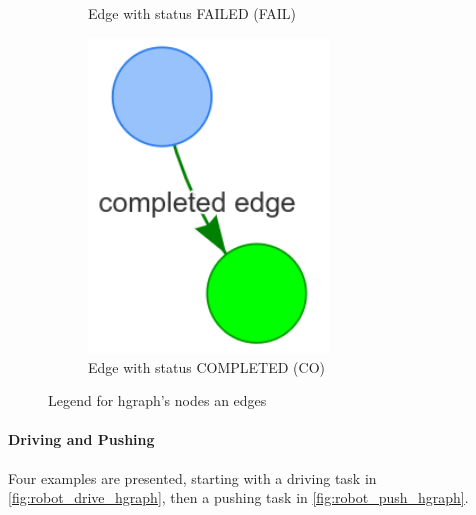 \begin{figure}[H]
\begin{subfigure}{0.33\textwidth}
    \caption{Edge with status FAILED (FAIL)}%
    \end{subfigure}
    \begin{subfigure}{0.33\textwidth}
    \centering
    \includegraphics[width=0.7\textwidth]{figures/connecting_nodes/legend/completed_edge}
    \caption{Edge with status COMPLETED (CO)}%
    \end{subfigure}
    \caption{Legend for \ac{hgraph}'s nodes an edges}%
    \label{fig:hgraph_legend}
\end{figure}

\paragraph{Driving and Pushing} Four examples are presented, starting with a driving task in \cref{fig:robot_drive_hgraph}, then a pushing task in \cref{fig:robot_push_hgraph}.\bs

